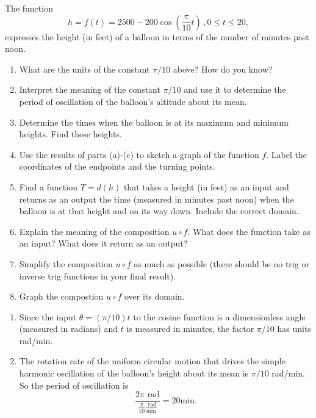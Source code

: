 \documentclass{ximera}
\begin{document}
\begin{question} \label{Q0fevme}
The function
\[
  h = f(t) = 2500 - 200 \cos \left(  \frac{\pi}{10}t  \right) \, , 0\leq t \leq 20 ,
\]
expresses the height (in feet) of a balloon in terms of the number of minutes past noon.

\begin{enumerate}

\item What are the units of the constant $\pi/10$ above? How do you know?

\item Interpret the meaning of the constant $\pi/10$ and use it to determine the period of oscillation of the balloon's altitude about its mean.

\item Determine the times when the balloon is at its maximum and minimum heights. Find these heights.

\item Use the results of parts (a)-(c) to sketch a graph of the function $f$. Label the coordinates of the endpoints and the turning points. 

\item  Find a function $T=d(h)$ that takes a height (in feet) as an input and returns as an output the time (measured in minutes past noon) when the balloon is at that height and on its way down. Include the correct domain.

\item  Explain the meaning of the composition $u\circ f$. What does the function take as an input? What does it return as an output? 

\item Simplify the composition $u\circ f$ as much as possible (there should be no trig or inverse trig functions in your final result). 

\item Graph the compostion $u\circ f$ over its domain.

\end{enumerate}

\begin{explanation}
\begin{enumerate}
\item Since the input $\theta = (\pi/10)t$ to the cosine function is a dimensionless angle (measured in radians) and $t$ is measured in minutes, the factor $\pi/10$ has units rad/min.

\item The rotation rate of the uniform circular motion that drives the simple harmonic oscillation of the balloon's height about its mean is $\pi/10$ rad/min. So the period of oscillation is
\[
  \frac{2\pi \text{ rad}}{\frac{\pi}{10} \frac{\text{ rad}}{\text{min}}} = 20 \text{min}.
\]


\end{enumerate}
\end{explanation}
\end{question}
\end{document}
